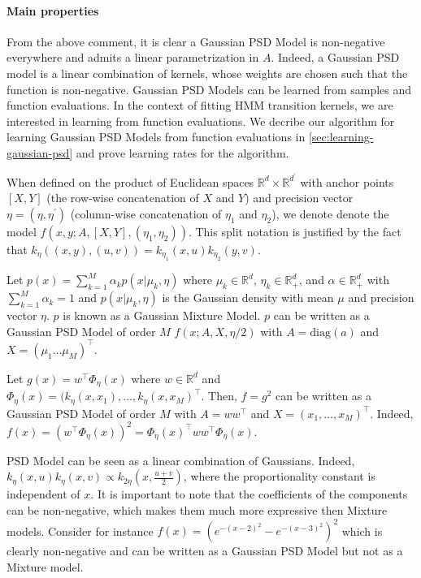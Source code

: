 \paragraph{Main properties} From the above comment, it is clear a Gaussian PSD Model is non-negative everywhere and admits a linear parametrization in $A$.  Indeed, a Gaussian PSD model is a linear combination of kernels, whose weights are chosen such that the function is non-negative. Gaussian PSD Models can be learned from samples and function evaluations. In the context of fitting HMM transition kernels, we are interested in learning from function evaluations. We decribe our algorithm for learning Gaussian PSD Models from function evaluations in \cref{sec:learning-gaussian-psd} and prove learning rates for the algorithm.


When defined on the product of Euclidean spaces $\mathbb R^d \times \mathbb R ^{d^\prime}$ with anchor points $[X, Y]$ (the row-wise concatenation of $X$ and $Y$) and precision vector $\eta = (\eta, \eta^\prime)$ (column-wise concatenation of $\eta_1$ and $\eta_2$), we denote denote the model $f(x, y ; A, [X, Y], (\eta_1, \eta_2))$. This split notation is justified by the fact that $k_\eta((x, y), (u, v)) = k_{\eta_1}(x, u)k_{\eta_2}(y, v)$.

\begin{example}\label{ex:mixtures} Let $p(x) = \sum_{k=1}^M\alpha_kp(x|\mu_k, \eta)$ where $\mu_k\in\mathbb R^d$, $\eta_k\in\mathbb R^d_+$, and $\alpha \in\mathbb R^d_+$ with $\sum_{k=1}^M\alpha_k = 1$ and $p(x|\mu_k, \eta)$ is the Gaussian density with mean $\mu$ and precision vector $\eta$. $p$ is known as a Gaussian Mixture Model. $p$ can be written as a Gaussian PSD Model of order $M$ $f(x ; A, X, \eta / 2)$ with $A=\textrm{diag}(a)$ and $X = (\mu_1 \ldots \mu_M)^\top $.
\end{example}

\begin{example}\label{ex:sq-linear-model}
Let $g(x) = w^\top \Phi_\eta(x)$ where $w\in\mathbb R^d$ and $\Phi_\eta(x)= (k_\eta(x, x_1), \ldots, k_\eta(x, x_M)^\top $. Then, $f=g^2$ can be written as a Gaussian PSD Model of order $M$ with $A=ww^\top $ and $X = (x_1, \ldots, x_M)^\top $. Indeed, $f(x) = (w^\top \Phi_\eta(x))^2 = \Phi_\eta(x)^\top ww^\top \Phi_\eta(x)$.
\end{example}


 PSD Model can be seen as a linear combination of Gaussians. Indeed, $k_\eta(x, u)k_\eta(x, v)\propto k_{2\eta}(x, \frac{u+v}{2})$, where the proportionality constant is independent of $x$. It is important to note that the coefficients of the components can be non-negative, which makes them much more expressive then Mixture models. Consider for instance $f(x) = (e^{-(x-2)^2} - e^{-(x-3)^2})^2$ which is clearly non-negative and can be written as a Gaussian PSD Model but not as a Mixture model.

